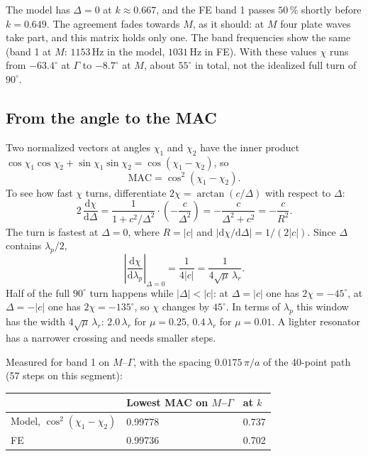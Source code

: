 The model has $\Delta = 0$ at $k \approx 0.667$, and the FE band 1 passes $50\,\%$
shortly before $k = 0.649$. The agreement fades towards $M$, as it should: at $M$
four plate waves take part, and this matrix holds only one. The band frequencies show
the same (band 1 at $M$: $1153\,\mathrm{Hz}$ in the model, $1031\,\mathrm{Hz}$ in
FE). With these values $\chi$ runs from $-63.4^\circ$ at $\Gamma$ to $-8.7^\circ$ at
$M$, about $55^\circ$ in total, not the idealized full turn of $90^\circ$.

\subsection{From the angle to the MAC}
Two normalized vectors at angles $\chi_1$ and $\chi_2$ have the inner product
$\cos\chi_1\cos\chi_2 + \sin\chi_1\sin\chi_2 = \cos(\chi_1 - \chi_2)$, so
\begin{equation}
  \mathrm{MAC} = \cos^2(\chi_1 - \chi_2) .
\end{equation}
To see how fast $\chi$ turns, differentiate $2\chi = \arctan(c/\Delta)$ with respect
to $\Delta$:
\begin{equation}
  2\,\frac{\mathrm{d}\chi}{\mathrm{d}\Delta}
  = \frac{1}{1 + c^2/\Delta^2}\cdot\left(-\frac{c}{\Delta^2}\right)
  = -\frac{c}{\Delta^2 + c^2}
  = -\frac{c}{R^2} .
\end{equation}
The turn is fastest at $\Delta = 0$, where $R = |c|$ and
$|\mathrm{d}\chi/\mathrm{d}\Delta| = 1/(2|c|)$. Since $\Delta$ contains $\lambda_p/2$,
\begin{equation}
  \left|\frac{\mathrm{d}\chi}{\mathrm{d}\lambda_p}\right|_{\Delta = 0}
  = \frac{1}{4|c|} = \frac{1}{4\sqrt{\mu}\,\lambda_r} .
\end{equation}
Half of the full $90^\circ$ turn happens while $|\Delta| < |c|$: at $\Delta = |c|$ one
has $2\chi = -45^\circ$, at $\Delta = -|c|$ one has $2\chi = -135^\circ$, so $\chi$
changes by $45^\circ$. In terms of $\lambda_p$ this window has the width
$4\sqrt{\mu}\,\lambda_r$: $2.0\,\lambda_r$ for $\mu = 0.25$, $0.4\,\lambda_r$ for
$\mu = 0.01$. A lighter resonator has a narrower crossing and needs smaller steps.

Measured for band 1 on $M$--$\Gamma$, with the spacing $0.0175\,\pi/a$ of the 40-point
path (57 steps on this segment):

\begin{center}
\begin{tabular}{|l|l|l|}
\hline
 & Lowest MAC on $M$--$\Gamma$ & at $k$ \\
\hline
Model, $\cos^2(\chi_1 - \chi_2)$ & 0.99778 & 0.737 \\
FE & 0.99736 & 0.702 \\
\hline
\end{tabular}
\end{center}

